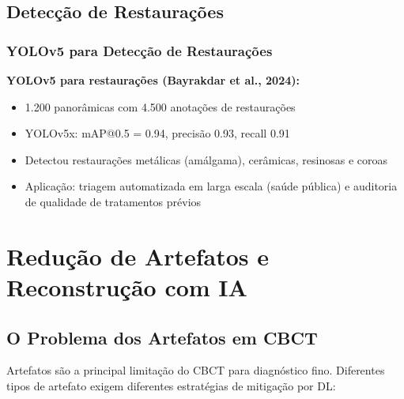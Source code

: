 \subsection{Detecção de Restaurações}

\subsubsection{YOLOv5 para Detecção de Restaurações}

\textbf{YOLOv5 para restaurações (Bayrakdar et al., 2024):} 
\begin{itemize}
  \item 1.200 panorâmicas com 4.500 anotações de restaurações
  \item YOLOv5x: mAP@0.5 = 0.94, precisão 0.93, recall 0.91
  \item Detectou restaurações metálicas (amálgama), cerâmicas, resinosas e coroas
  \item Aplicação: triagem automatizada em larga escala (saúde pública) e
        auditoria de qualidade de tratamentos prévios
\end{itemize}

\section{Redução de Artefatos e Reconstrução com IA}
\label{sec:artefatos-dl}

\subsection{O Problema dos Artefatos em CBCT}

Artefatos são a principal limitação do CBCT para diagnóstico fino. Diferentes
tipos de artefato exigem diferentes estratégias de mitigação por DL:

